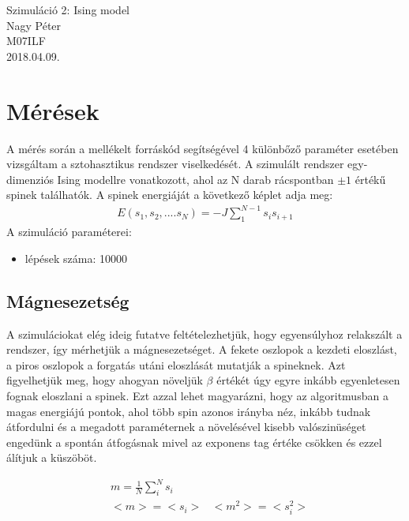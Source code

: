 \documentclass[paper=a4, fontsize=11pt]{article}
\begin{document}
\begingroup
	\centering
	\LARGE Szimuláció 2: Ising model\\
\vspace{1 cm}
\large Nagy Péter\\
\large M07ILF\\
\vfill
\large 2018.04.09.\\

\newpage

\tableofcontents
\newpage


\section{Mérések}
A mérés során a mellékelt forráskód segítségével 4 különbőző paraméter esetében vizsgáltam a sztohasztikus rendszer viselkedését. A szimulált rendszer egy-dimenziós Ising modellre vonatkozott, ahol az N darab rácspontban $\pm 1$ értékű spinek találhatók. A spinek energiáját a következő képlet adja meg:
\begin{align}
E(s_1,s_2,....s_N)=-J\sum_{1}^{N-1}s_i s_{i+1}
\end{align} 
\newline
\flushleft
 A szimuláció paraméterei:

\begin{itemize}
  \item lépések száma: 10000
\end{itemize}
  



\subsection{Mágnesezetség}
A szimuláciokat elég ideig futatve feltételezhetjük, hogy egyensúlyhoz relakszált a rendszer, így mérhetjük a mágnesezetséget. A fekete oszlopok a kezdeti eloszlást, a piros oszlopok a forgatás utáni eloszlását mutatják a spineknek. Azt figyelhetjük meg, hogy ahogyan növeljük $\beta$ értékét úgy egyre inkább egyenletesen fognak eloszlani a spinek. Ezt azzal lehet magyarázni, hogy az algoritmusban a magas energiájú pontok, ahol több spin azonos irányba néz, inkább tudnak átfordulni és a megadott paraméternek a növelésével kisebb valószinüséget engedünk a spontán átfogásnak mivel az exponens tag értéke csökken és ezzel álítjuk a küszöböt.

\begin{align}
&m=\frac{1}{N}\sum_i^N s_i\\
&<m>=<s_i>
&<m^2>=<s_i^2>
\end{align}
\end{document}
